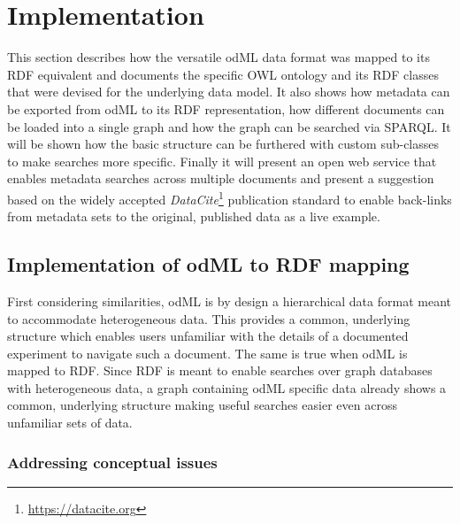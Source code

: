 \documentclass{article}
\begin{document}
\section{Implementation} \label{sec:implementation}

This section describes how the versatile odML data format was mapped to its RDF equivalent and documents the specific OWL ontology and its RDF classes that were devised for the underlying data model. It also shows how metadata can be exported from odML to its RDF representation, how different documents can be loaded into a single graph and how the graph can be searched via SPARQL. It will be shown how the basic structure can be furthered with custom sub-classes to make searches more specific. Finally it will present an open web service that enables metadata searches across multiple documents and present a suggestion based on the widely accepted \textit{DataCite}\footnote{\url{https://datacite.org}} publication standard to enable back-links from metadata sets to the original, published data as a live example.

\subsection{Implementation of odML to RDF mapping} \label{sec:odml_rdf}


First considering similarities, odML is by design a hierarchical data format meant to accommodate heterogeneous data. This provides a common, underlying structure which enables users unfamiliar with the details of a documented experiment to navigate such a document. The same is true when odML is mapped to RDF. Since RDF is meant to enable searches over graph databases with heterogeneous data, a graph containing odML specific data already shows a common, underlying structure making useful searches easier even across unfamiliar sets of data.

\subsubsection{Addressing conceptual issues} \label{sec:odml_rdf_concepts}
\end{document}
